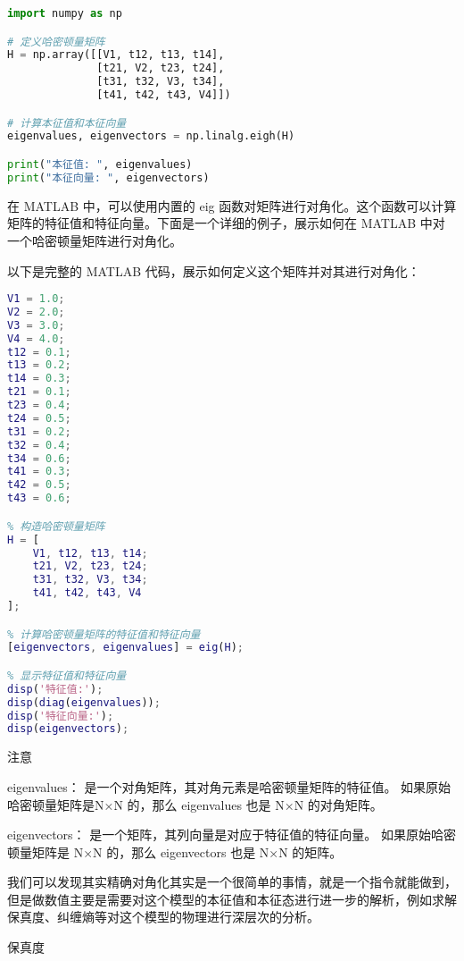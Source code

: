 \begin{lstlisting}[language=python]
import numpy as np

# 定义哈密顿量矩阵
H = np.array([[V1, t12, t13, t14],
              [t21, V2, t23, t24],
              [t31, t32, V3, t34],
              [t41, t42, t43, V4]])

# 计算本征值和本征向量
eigenvalues, eigenvectors = np.linalg.eigh(H)

print("本征值: ", eigenvalues)
print("本征向量: ", eigenvectors)

\end{lstlisting}
在 MATLAB 中，可以使用内置的 eig 函数对矩阵进行对角化。这个函数可以计算矩阵的特征值和特征向量。下面是一个详细的例子，展示如何在 MATLAB 中对一个哈密顿量矩阵进行对角化。

以下是完整的 MATLAB 代码，展示如何定义这个矩阵并对其进行对角化：

\begin{lstlisting}[language=matlab]
% 定义哈密顿量矩阵的元素
V1 = 1.0;
V2 = 2.0;
V3 = 3.0;
V4 = 4.0;
t12 = 0.1;
t13 = 0.2;
t14 = 0.3;
t21 = 0.1;
t23 = 0.4;
t24 = 0.5;
t31 = 0.2;
t32 = 0.4;
t34 = 0.6;
t41 = 0.3;
t42 = 0.5;
t43 = 0.6;

% 构造哈密顿量矩阵
H = [
    V1, t12, t13, t14;
    t21, V2, t23, t24;
    t31, t32, V3, t34;
    t41, t42, t43, V4
];

% 计算哈密顿量矩阵的特征值和特征向量
[eigenvectors, eigenvalues] = eig(H);

% 显示特征值和特征向量
disp('特征值:');
disp(diag(eigenvalues));
disp('特征向量:');
disp(eigenvectors);

\end{lstlisting}
注意

eigenvalues：
是一个对角矩阵，其对角元素是哈密顿量矩阵的特征值。
如果原始哈密顿量矩阵是N×N 的，那么 eigenvalues 也是 N×N 的对角矩阵。

eigenvectors：
是一个矩阵，其列向量是对应于特征值的特征向量。
如果原始哈密顿量矩阵是 N×N 的，那么 eigenvectors 也是 N×N 的矩阵。

我们可以发现其实精确对角化其实是一个很简单的事情，就是一个指令就能做到，但是做数值主要是需要对这个模型的本征值和本征态进行进一步的解析，例如求解保真度、纠缠熵等对这个模型的物理进行深层次的分析。\begin{lemma}{保真度}

\end{lemma}